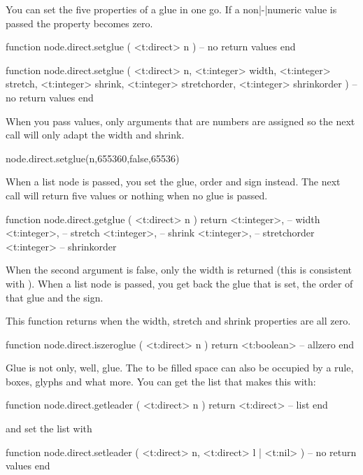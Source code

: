 \stopsubsection

\startsubsection[title={Glue}]

You can set the five properties of a glue in one go. If a non|-|numeric value is
passed the property becomes zero.

\starttyping[option=LUA]
function node.direct.setglue ( <t:direct> n )
    -- no return values
end

function node.direct.setglue (
    <t:direct>  n,
    <t:integer> width,
    <t:integer> stretch,
    <t:integer> shrink,
    <t:integer> stretchorder,
    <t:integer> shrinkorder
)
    -- no return values
end
\stoptyping

When you pass values, only arguments that are numbers are assigned so the next
call will only adapt the width and shrink.

\starttyping[option=LUA]
node.direct.setglue(n,655360,false,65536)
\stoptyping


When a list node is passed, you set the glue, order and sign instead. The next
call will return five values or nothing when no glue is passed.

\starttyping[option=LUA]
function node.direct.getglue ( <t:direct> n )
    return
        <t:integer>, -- width
        <t:integer>, -- stretch
        <t:integer>, -- shrink
        <t:integer>, -- stretchorder
        <t:integer>  -- shrinkorder
\stoptyping

When the second argument is false, only the width is returned (this is consistent
with ). When a list node is passed, you get back the glue that is
set, the order of that glue and the sign.

This function returns  when the width, stretch and shrink properties
are all zero.

\starttyping[option=LUA]
function node.direct.iszeroglue ( <t:direct> n )
    return <t:boolean> -- allzero
end
\stoptyping

Glue is not only, well, glue. The to be filled space can also be occupied by a rule,
boxes, glyphs and what more. You can get the list that makes this with:

\starttyping[option=LUA]
function node.direct.getleader ( <t:direct> n )
    return <t:direct> -- list
end
\stoptyping

and set the list with

\starttyping[option=LUA]
function node.direct.setleader ( <t:direct> n, <t:direct> l | <t:nil> )
    -- no return values
end
\stoptyping

